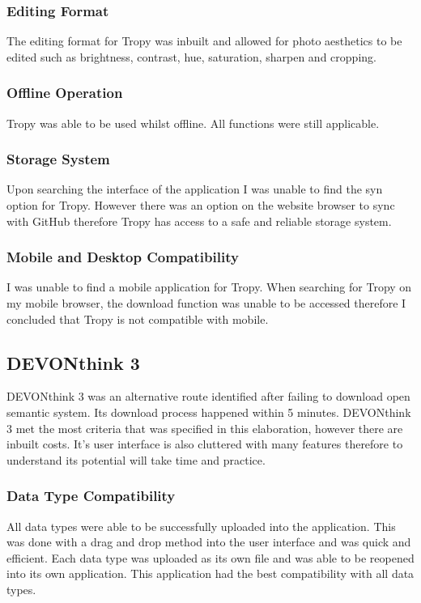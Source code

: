 \documentclass{article}
\begin{document}
\subsubsection{Editing Format}
The editing format for Tropy was inbuilt and allowed for photo aesthetics to be edited such as brightness, contrast, hue, saturation, sharpen and cropping. 
\subsubsection{Offline Operation}
Tropy was able to be used whilst offline. All functions were still applicable.
\subsubsection{Storage System}
Upon searching the interface of the application I was unable to find the syn option for Tropy. However there was an option on the website browser to sync with GitHub therefore Tropy has access to a safe and reliable storage system.
\subsubsection{Mobile and Desktop Compatibility}
I was unable to find a mobile application for Tropy. When searching for Tropy on my mobile browser, the download function was unable to be accessed therefore I concluded that Tropy is not compatible with mobile. 

\subsection{DEVONthink 3}
DEVONthink 3 was an alternative route identified after failing to download open semantic system. Its download process happened within 5 minutes. DEVONthink 3 met the most criteria that was specified in this elaboration, however there are inbuilt costs. It's user interface is also cluttered with many features therefore to understand its potential will take time and practice.
\subsubsection{Data Type Compatibility}
All data types were able to be successfully uploaded into the application. This was done with a drag and drop method into the user interface and was quick and efficient. Each data type was uploaded as its own file and was able to be reopened into its own application. This application had the best compatibility with all data types.
\end{document}
